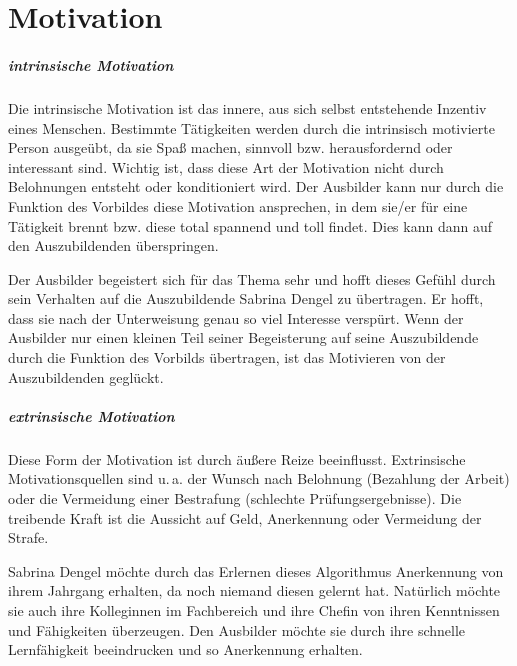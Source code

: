 \chapter{Motivation}

\paragraph{intrinsische Motivation}
Die intrinsische Motivation ist das innere, aus sich selbst entstehende Inzentiv eines Menschen. Bestimmte Tätigkeiten werden durch die intrinsisch motivierte Person ausgeübt, da sie Spaß machen, sinnvoll bzw. herausfordernd oder interessant sind. Wichtig ist, dass diese Art der Motivation nicht durch Belohnungen entsteht oder konditioniert wird. Der Ausbilder kann nur durch die Funktion des Vorbildes diese Motivation ansprechen, in dem sie/er für eine Tätigkeit brennt bzw. diese total spannend und toll findet. Dies kann dann auf den Auszubildenden überspringen. 
\par
Der Ausbilder begeistert sich für das Thema sehr und hofft dieses Gefühl durch sein Verhalten auf die Auszubildende Sabrina Dengel zu übertragen. Er hofft, dass sie nach der Unterweisung genau so viel Interesse verspürt. Wenn der Ausbilder nur einen kleinen Teil seiner Begeisterung auf seine Auszubildende durch die Funktion des Vorbilds übertragen, ist das Motivieren von der Auszubildenden geglückt. 

\paragraph{extrinsische Motivation}
Diese Form der Motivation ist durch äußere Reize beeinflusst. Extrinsische Motivationsquellen sind u.\,a. der Wunsch nach Belohnung (Bezahlung der Arbeit) oder die Vermeidung einer Bestrafung (schlechte Prüfungsergebnisse). Die treibende Kraft ist die Aussicht auf Geld, Anerkennung oder Vermeidung der Strafe.
\par
Sabrina Dengel möchte durch das Erlernen dieses Algorithmus Anerkennung von ihrem Jahrgang erhalten, da noch niemand diesen gelernt hat. Natürlich möchte sie auch ihre Kolleginnen im Fachbereich und ihre Chefin von ihren Kenntnissen und Fähigkeiten überzeugen. Den Ausbilder möchte sie durch ihre schnelle Lernfähigkeit beeindrucken und so Anerkennung erhalten.